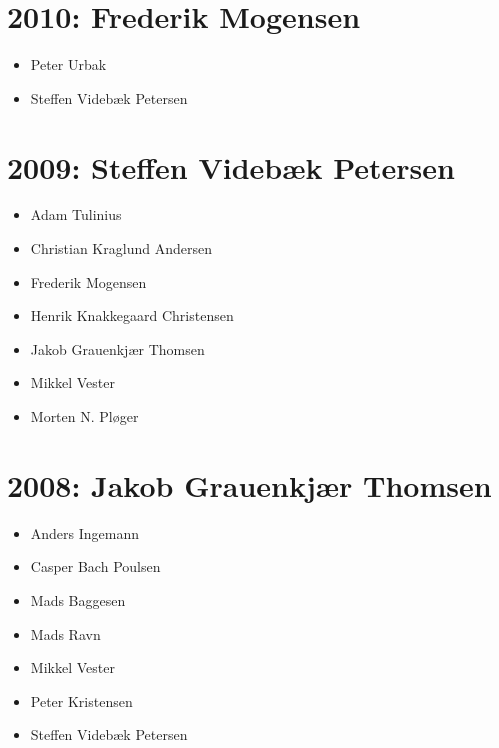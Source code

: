\documentclass[article,oneside,a4paper]{memoir}
\begin{document}
\section*{2010: Frederik Mogensen}

\begin{itemize}
  \item Peter Urbak
  \item Steffen Videbæk Petersen
\end{itemize}

\section*{2009: Steffen Videbæk Petersen}

\begin{itemize}
  \item Adam Tulinius
  \item Christian Kraglund Andersen
  \item Frederik Mogensen
  \item Henrik Knakkegaard Christensen
  \item Jakob Grauenkjær Thomsen
  \item Mikkel Vester
  \item Morten N. Pløger
\end{itemize}

\section*{2008: Jakob Grauenkjær Thomsen}

\begin{itemize}
  \item Anders Ingemann
  \item Casper Bach Poulsen
  \item Mads Baggesen
  \item Mads Ravn
  \item Mikkel Vester
  \item Peter Kristensen
  \item Steffen Videbæk Petersen
\end{itemize}
\end{document}
